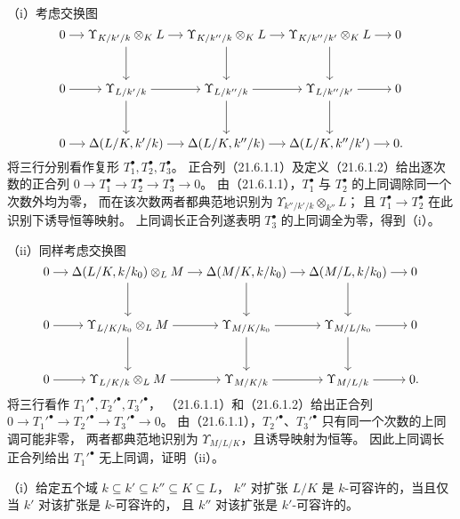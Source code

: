 \eproof
（i）考虑交换图
\[
\begin{tikzcd}[column sep=small,row sep=large,cramped]
 0\arrow[r]&\Upsilon_{K/k'/k}\otimes_KL\arrow[r]\arrow[d]
 &\Upsilon_{K/k''/k}\otimes_KL\arrow[r]\arrow[d]
 &\Upsilon_{K/k''/k'}\otimes_KL\arrow[r]\arrow[d]&0\\
 0\arrow[r]&\Upsilon_{L/k'/k}\arrow[r]\arrow[d]
 &\Upsilon_{L/k''/k}\arrow[r]\arrow[d]
 &\Upsilon_{L/k''/k'}\arrow[r]\arrow[d]&0\\
 0\arrow[r]&\Delta(L/K,k'/k)\arrow[r]
 &\Delta(L/K,k''/k)\arrow[r]
 &\Delta(L/K,k''/k')\arrow[r]&0.
\end{tikzcd}
\]
将三行分别看作复形 $T_1^\bullet,T_2^\bullet,T_3^\bullet$。
正合列（21.6.1.1）及定义（21.6.1.2）给出逐次数的正合列
$0\to T_1^\bullet\to T_2^\bullet\to T_3^\bullet\to0$。
由（21.6.1.1），$T_1^\bullet$ 与 $T_2^\bullet$ 的上同调除同一个次数外均为零，
而在该次数两者都典范地识别为
$\Upsilon_{k''/k'/k}\otimes_{k''}L$；
且 $T_1^\bullet\to T_2^\bullet$ 在此识别下诱导恒等映射。
上同调长正合列遂表明 $T_3^\bullet$ 的上同调全为零，得到（i）。

（ii）同样考虑交换图
\[
\begin{tikzcd}[column sep=small,row sep=large,cramped]
 0\arrow[r]&\Delta(L/K,k/k_0)\otimes_LM\arrow[r]\arrow[d]
 &\Delta(M/K,k/k_0)\arrow[r]\arrow[d]
 &\Delta(M/L,k/k_0)\arrow[r]\arrow[d]&0\\
 0\arrow[r]&\Upsilon_{L/K/k_0}\otimes_LM\arrow[r]\arrow[d]
 &\Upsilon_{M/K/k_0}\arrow[r]\arrow[d]
 &\Upsilon_{M/L/k_0}\arrow[r]\arrow[d]&0\\
 0\arrow[r]&\Upsilon_{L/K/k}\otimes_LM\arrow[r]
 &\Upsilon_{M/K/k}\arrow[r]
 &\Upsilon_{M/L/k}\arrow[r]&0.
\end{tikzcd}
\]
将三行看作 $T_1'^\bullet,T_2'^\bullet,T_3'^\bullet$，
（21.6.1.1）和（21.6.1.2）给出正合列
$0\to T_1'^\bullet\to T_2'^\bullet\to T_3'^\bullet\to0$。
由（21.6.1.1），$T_2'^\bullet$、$T_3'^\bullet$ 只有同一个次数的上同调可能非零，
两者都典范地识别为 $\Upsilon_{M/L/K}$，且诱导映射为恒等。
因此上同调长正合列给出 $T_1'^\bullet$ 无上同调，证明（ii）。
\finishproof

（i）给定五个域 $k\subseteq k'\subseteq k''\subseteq K\subseteq L$，
$k''$ 对扩张 $L/K$ 是 $k$-可容许的，当且仅当 $k'$ 对该扩张是 $k$-可容许的，
且 $k''$ 对该扩张是 $k'$-可容许的。


